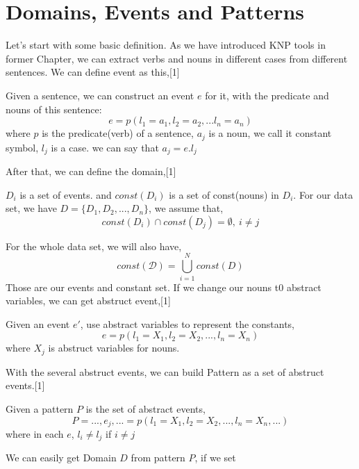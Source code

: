 \section{Domains, Events and Patterns}
Let's start with some basic definition. As we have introduced KNP tools in former Chapter, we can extract verbs and nouns in different cases from different sentences. We can define event as this,[1]
\begin{definition}
Given a sentence, we can construct an event $e$ for it, with the predicate and nouns of this sentence:
\begin{displaymath} 
e = p(l_1 = a_1, l_2 = a_2,...l_n = a_n)
\end{displaymath}
where $p$ is the predicate(verb) of a sentence, $a_j$ is a noun, we call it constant symbol, $l_j$ is a case. we can say that 
$a_j = e.l_j$
\end{definition}
After that, we can define the domain,[1]
\begin{definition}
$D_i$ is a set of events. and $const(D_i)$ is a set of const(nouns) in $D_i$. For our data set, we have $D = \{D_1,D_2,...,D_n\}$, we assume that, 
\begin{displaymath}
const(D_i)\cap const(D_j) = \emptyset, \ i\ne j
\end{displaymath}
\end{definition}
For the whole data set, we will also have,
\begin{displaymath}
const(\mathcal{D}) = \bigcup_{i =1}^{N}const(D)
\end{displaymath}
Those are our events and constant set. If we change our nouns t0 abstract variables, we can get abstruct event,[1]
\begin{definition}
Given an event $e'$, use abstract variables to represent the constants,
\begin{displaymath}
e = p(l_1 = X_1, l_2= X_2,...,l_n = X_n)
\end{displaymath}
where $X_j$ is abstruct variables for nouns.
\end{definition}
With the several abstruct events, we can build Pattern as a set of abstruct events.[1]
\begin{definition}
Given a pattern $P$ is the set of abstract events,
\begin{displaymath}
P = {...,e_j,... = p(l_1 = X_1, l_2 = X_2,...,l_n = X_n,...)}
\end{displaymath}
where in each $e$, $l_i \ne l_j$ if $i\ne j$
\end{definition}
We can easily get Domain $D$ from pattern $P$, if we set 
